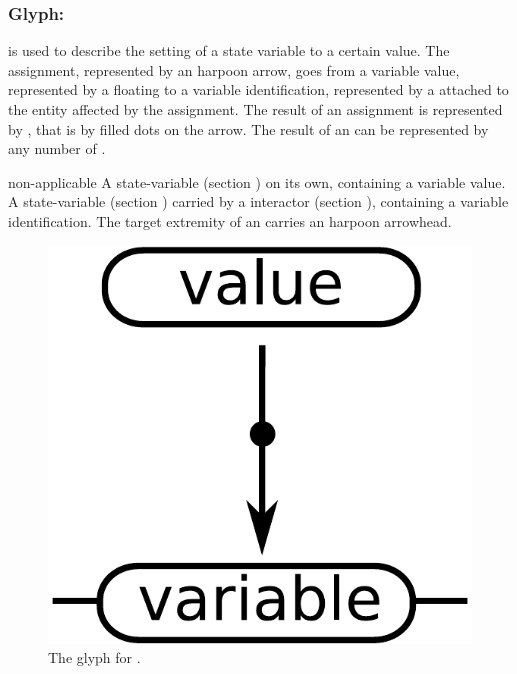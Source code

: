 \color{blue}

\subsubsection{Glyph: }\label{sec:assignment}

 is used to describe the setting of a state variable to a certain value. The assignment, represented by an harpoon arrow, goes from a variable value, represented by a floating  to a variable identification, represented by a  attached to the entity affected by the assignment.  The result of an assignment is represented by , that is by filled dots on the arrow. The result of an  can be represented by any number of .


\begin{glyphDescription}
 \glyphSboTerm non-applicable
 \glyphOrigin A state-variable (section ) on its own, containing a variable value.
 \glyphTarget A state-variable (section ) carried by a interactor (section ), containing a variable identification.
 \glyphEndPoint The target extremity of an  carries an harpoon arrowhead.
 \end{glyphDescription}


\begin{figure}[H]
  \centering
  \includegraphics[scale = 0.3]{images/assignment}
  \caption{The \ER glyph for .}
  \label{fig:assignment}
\end{figure}

